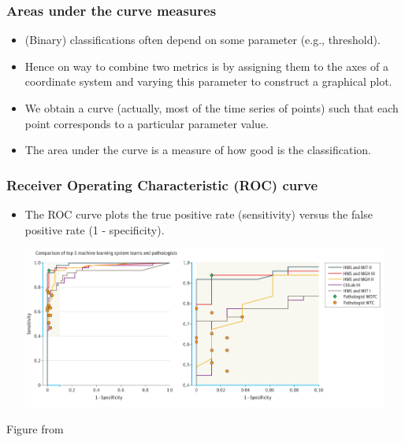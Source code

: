 \documentclass[notes]{beamer}          %
\begin{document}
\begin{frame}
\frametitle{Areas under the curve measures}
    \begin{itemize}
        \item (Binary) classifications often depend on some parameter (e.g., threshold).
        \item Hence on way to combine two metrics is by assigning them to the axes of a coordinate system and varying this parameter to construct a graphical plot.
        \item We obtain a curve (actually, most of the time series of points) such that each point corresponds to a particular parameter value.
        \item The area under the curve is a measure of how good is the classification.
    \end{itemize}
\end{frame}


\begin{frame}
\frametitle{Receiver Operating Characteristic (ROC) curve}
    \begin{itemize}
        \item The ROC curve plots the true positive rate (sensitivity) versus the false positive rate (1 - specificity).
        \begin{center}
        \includegraphics[width=0.95\textwidth]{../figures/week_1/camelyon_roc.png}
        \end{center}
    \end{itemize}
    {\tiny Figure from \cite{camelyon}}
\end{frame}
\end{document}
